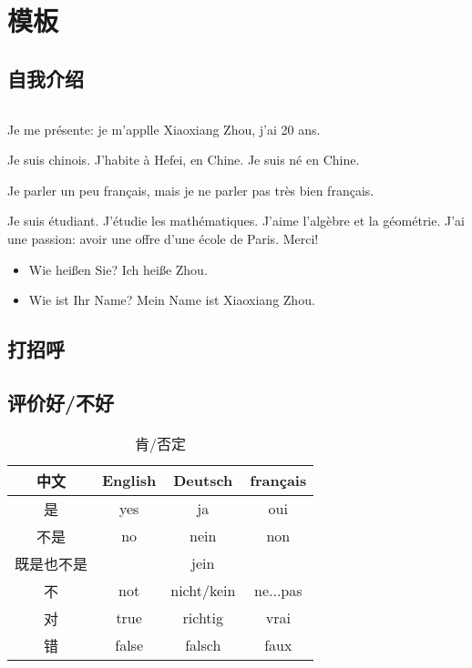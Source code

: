 \documentclass[12pt,A4paper,oneside,reqno]{amsart}
\numberwithin{equation}{section}
\theoremstyle{plain}
\theoremstyle{plain}
\theoremstyle{plain}
\numberwithin{equation}{section}
\theoremstyle{remark}
\begin{document}
\section{模板}
\subsection{自我介绍}$\,$

Je me pr\'{e}sente: je m'applle Xiaoxiang Zhou, j'ai 20 ans.

Je suis chinois. J'habite \`{a} Hefei, en Chine. Je suis n\'{e} en Chine.

Je parler un peu français, mais je ne parler pas tr\`{e}s bien français.

Je suis \'{e}tudiant. J'\'{e}tudie les math\'{e}matiques. J'aime l'alg\`{e}bre et la g\'{e}om\'{e}trie. J'ai une passion: avoir une offre d'une \'{e}cole de Paris. Merci!

\begin{itemize}
	\item Wie hei\ss en Sie? Ich hei\ss e Zhou.
	\item Wie ist Ihr Name? Mein Name ist Xiaoxiang Zhou.
\end{itemize}
\subsection{打招呼}\hspace{1cm}
\subsection{评价好/不好}\hspace{1cm}
\begin{table}[th]
	\centering
	\begin{tabular}{c|c|c|c}
		\hline
中文	&	English	&	Deutsch	&	français	\\
\hline							
是	&	yes	&	ja	&	oui	\\
不是	&	no	&	nein	&	non	\\
既是也不是	&		&	jein	&		\\
不	&	not	&	nicht/kein	&	ne...pas	\\
对	&	true	&	richtig	&	vrai	\\
错	&	false	&	falsch	&	faux	\\

		\hline
	\end{tabular}
	\vspace{0.5cm}
	\caption{肯/否定}
\end{table}
\end{document}
